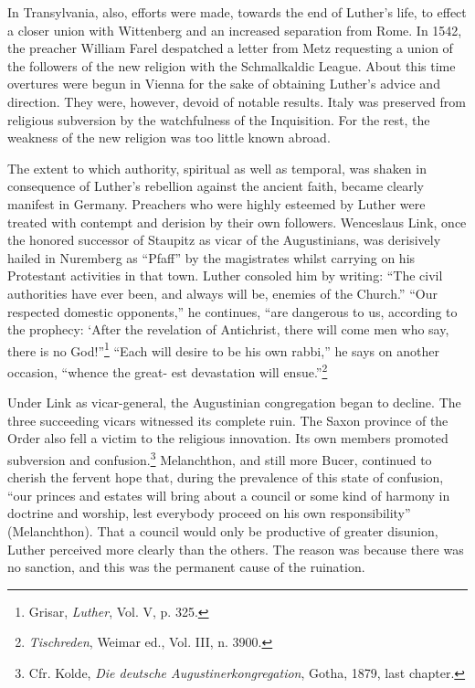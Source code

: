 In Transylvania, also, efforts were made, towards the end of Luther’s
life, to effect a closer union with Wittenberg and an increased
separation from Rome. In 1542, the preacher William Farel despatched a
letter from Metz requesting a union of the followers of the
new religion with the Schmalkaldic League. About this time overtures
were begun in Vienna for the sake of obtaining Luther’s advice and
direction. They were, however, devoid of notable results. Italy was
preserved from religious subversion by the watchfulness of the Inquisition.
For the rest, the weakness of the new religion was too little
known abroad.

The extent to which authority, spiritual as well as temporal, was
shaken in consequence of Luther’s rebellion against the ancient faith,
became clearly manifest in Germany. Preachers who were highly
esteemed by Luther were treated with contempt and derision by their
own followers. Wenceslaus Link, once the honored successor of Staupitz
as vicar of the Augustinians, was derisively hailed in Nuremberg
as “Pfaff” by the magistrates whilst carrying on his Protestant activities
in that town. Luther consoled him by writing: “The civil authorities have
ever been, and always will be, enemies of the Church.”
“Our respected domestic opponents,” he continues, “are dangerous
to us, according to the prophecy: ‘After the revelation of Antichrist,
there will come men who say, there is no God!”\footnote{Grisar, \textit{Luther}, Vol. V, p. 325.}
“Each will desire
to be his own rabbi,” he says on another occasion, “whence the great-
est devastation will ensue.”\footnote{\textit{Tischreden}, Weimar ed., Vol. III, n. 3900.}

Under Link as vicar-general, the Augustinian congregation began
to decline. The three succeeding vicars witnessed its complete
ruin. The Saxon province of the Order also fell a victim to the religious
innovation. Its own members promoted subversion and confusion.\footnote{Cfr. Kolde, \textit{Die deutsche Augustinerkongregation}, Gotha, 1879, last chapter.}
Melanchthon, and still more Bucer, continued to cherish the
fervent hope that, during the prevalence of this state of confusion,
“our princes and estates will bring about a council or some kind of
harmony in doctrine and worship, lest everybody proceed on his own
responsibility” (Melanchthon). That a council would only be productive
of greater disunion, Luther perceived more clearly than the
others. The reason was because there was no sanction, and this was
the permanent cause of the ruination.

